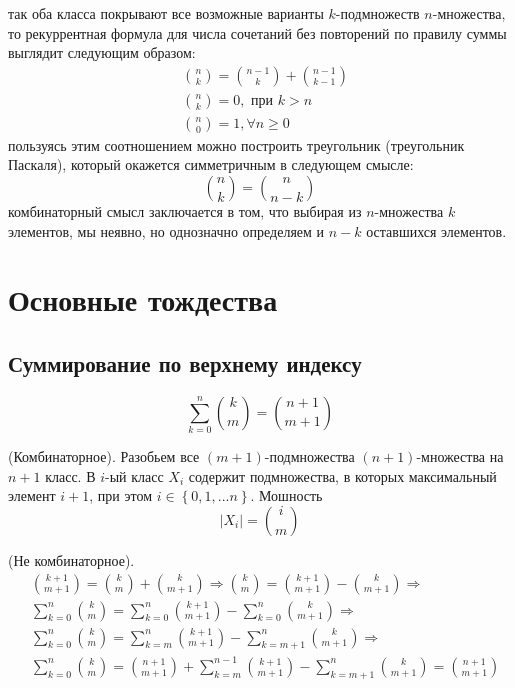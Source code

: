 так оба класса покрывают все возможные варианты $k$-подмножеств $n$-множества, то рекуррентная формула для числа сочетаний без повторений по правилу суммы выглядит следующим образом:
\begin{align}
	& \binom{n}{k} = \binom{n-1}{k} + \binom{n-1}{k-1}\\
	& \binom{n}{k} = 0, \text{ при } k > n\\
	& \binom{n}{0} = 1, \forall n \ge 0
\end{align}
пользуясь этим соотношением можно построить треугольник (треугольник Паскаля), который окажется симметричным в следующем смысле:
\begin{equation}
	\binom{n}{k} = \binom{n}{n-k}
\end{equation}
комбинаторный смысл заключается в том, что выбирая из $n$-множества $k$ элементов, мы неявно, но однозначно определяем и $n-k$ оставшихся элементов.

\section{Основные тождества}
\subsection{Суммирование по верхнему индексу}
\begin{equation}
\sum_{k=0}^n\binom{k}{m} = \binom{n+1}{m+1}
\end{equation}
\begin{Proof} (Комбинаторное). Разобьем все $\left(m+1\right)$-подмножества $\left(n+1\right)$-множества на $n+1$ класс. В $i$-ый класс $X_i$ содержит подмножества, в которых максимальный элемент $i+1$, при этом $i \in \left\{0,1,...n\right\}$. Мошность $$ \left|X_i\right| = \binom{i}{m} $$
\end{Proof}
\begin{Proof} (Не комбинаторное).
\[
	\begin{split}
		&\binom{k+1}{m+1} = \binom{k}{m} + \binom{k}{m+1} \Rightarrow \binom{k}{m} = \binom{k+1}{m+1} - \binom{k}{m+1} \Rightarrow \\
		&\sum_{k=0}^n\binom{k}{m} = \sum_{k=0}^n\binom{k+1}{m+1} - \sum_{k=0}^n\binom{k}{m+1} \Rightarrow \\
		&\sum_{k=0}^n\binom{k}{m} = \sum_{k=m}^n\binom{k+1}{m+1} - \sum_{k=m+1}^n\binom{k}{m+1} \Rightarrow \\
		&\sum_{k=0}^n\binom{k}{m} = \binom{n+1}{m+1} + \sum_{k=m}^{n-1}\binom{k+1}{m+1} - \sum_{k=m+1}^n\binom{k}{m+1} = \binom{n+1}{m+1}
	\end{split}
\]
\end{Proof}
